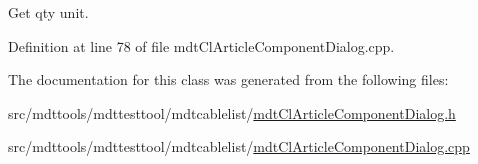 Get qty unit. 



Definition at line 78 of file mdt\-Cl\-Article\-Component\-Dialog.\-cpp.



The documentation for this class was generated from the following files\-:\begin{DoxyCompactItemize}
\item 
src/mdttools/mdttesttool/mdtcablelist/\hyperlink{mdt_cl_article_component_dialog_8h}{mdt\-Cl\-Article\-Component\-Dialog.\-h}\item 
src/mdttools/mdttesttool/mdtcablelist/\hyperlink{mdt_cl_article_component_dialog_8cpp}{mdt\-Cl\-Article\-Component\-Dialog.\-cpp}\end{DoxyCompactItemize}
